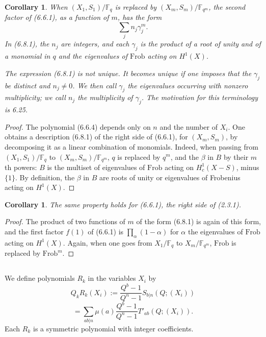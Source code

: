 \documentclass[11pt,a4paper]{article}
\theoremstyle{plain}
\newtheorem{corollary}[theorem]{Corollary}
\theoremstyle{definition}
\newcommand{\Fq}{\mathbb{F}_q}
\newcommand{\F}{\mathbb{F}}
\newcommand{\Frob}{\mathrm{Frob}}
\begin{document}
\begin{corollary}
When $(X_1, S_1)/\Fq$ is replaced by $(X_m, S_m)/\F_{q^m}$, the second factor of (6.6.1), as a function of $m$, has the form
\begin{equation}
\sum_j n_j \gamma_j^m. \tag{6.8.1}
\end{equation}
In (6.8.1), the $n_j$ are integers, and each $\gamma_j$ is the product of a root of unity and of a monomial in $q$ and the eigenvalues of $\Frob$ acting on $H^1(X)$.

The expression (6.8.1) is not unique. It becomes unique if one imposes that the $\gamma_j$ be distinct and $n_j \neq 0$. We then call $\gamma_j$ the eigenvalues occurring with nonzero multiplicity; we call $n_j$ the multiplicity of $\gamma_j$. The motivation for this terminology is 6.25.
\end{corollary}

\begin{proof}
The polynomial (6.6.4) depends only on $n$ and the number of $X_i$. One obtains a description (6.8.1) of the right side of (6.6.1), for $(X_m, S_m)$, by decomposing it as a linear combination of monomials. Indeed, when passing from $(X_1, S_1)/\Fq$ to $(X_m, S_m)/\F_{q^m}$, $q$ is replaced by $q^m$, and the $\beta$ in $B$ by their $m$th powers: $B$ is the multiset of eigenvalues of $\Frob$ acting on $H_c^1(X - S)$, minus $\{1\}$. By definition, the $\beta$ in $B$ are roots of unity or eigenvalues of Frobenius acting on $H^1(X)$.
\end{proof}

\begin{corollary}
The same property holds for (6.6.1), the right side of (2.3.1).
\end{corollary}

\begin{proof}
The product of two functions of $m$ of the form (6.8.1) is again of this form, and the first factor $f(1)$ of (6.6.1) is $\prod_\alpha (1 - \alpha)$ for $\alpha$ the eigenvalues of $\Frob$ acting on $H^1(X)$. Again, when one goes from $X_1/\Fq$ to $X_m/\F_{q^m}$, $\Frob$ is replaced by $\Frob^m$.
\end{proof}

\subsection{}
We define polynomials $R_k$ in the variables $X_i$ by
\begin{equation}
Q_k R_k(X_i) := \frac{Q^b - 1}{Q^n - 1} S_{b|n}(Q; (X_i)) \tag{6.10.1}
\end{equation}
\[
= \sum_{ab | n} \mu(a) \frac{Q^b - 1}{Q^n - 1} T'_{ab}(Q; (X_i)).
\]
Each $R_k$ is a symmetric polynomial with integer coefficients.
\end{document}
